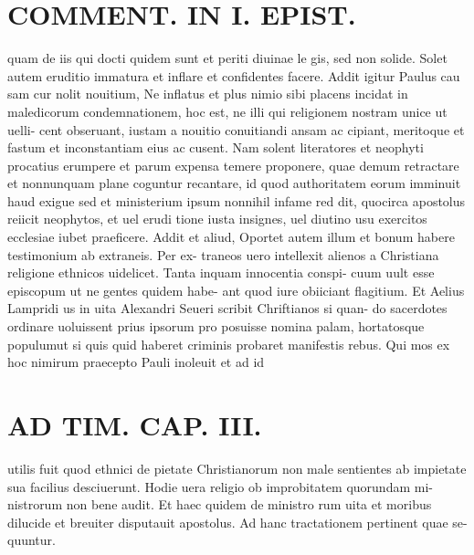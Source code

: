\documentclass{article}
\begin{document}
\begin{pages}
\section*{COMMENT. IN I. EPIST. }\pstart quam de iis qui docti quidem sunt et periti diuinae le gis, sed non solide. Solet autem eruditio immatura et inflare et confidentes facere. Addit igitur Paulus cau sam cur nolit nouitium, Ne inflatus et plus nimio sibi placens incidat in maledicorum condemnationem, hoc est, ne illi qui religionem nostram unice ut uelli- cent obseruant, iustam a nouitio conuitiandi ansam ac cipiant, meritoque et fastum et inconstantiam eius ac cusent. Nam solent literatores et neophyti procatius erumpere et parum expensa temere proponere, quae demum retractare et nonnunquam plane coguntur recantare, id quod authoritatem eorum imminuit haud exigue sed et ministerium ipsum nonnihil infame red dit, quocirca apostolus reiicit neophytos, et uel erudi tione iusta insignes, uel diutino usu exercitos ecclesiae iubet praeficere. Addit et aliud, Oportet autem illum et bonum habere testimonium ab extraneis. Per ex- traneos uero intellexit alienos a Christiana religione ethnicos uidelicet. Tanta inquam innocentia conspi- cuum uult esse episcopum ut ne gentes quidem habe- ant quod iure obiiciant flagitium. Et Aelius Lampridi us in uita Alexandri Seueri scribit Chriftianos si quan- do sacerdotes ordinare uoluissent prius ipsorum pro posuisse nomina palam, hortatosque populumut si quis quid haberet criminis probaret manifestis rebus. Qui mos ex hoc nimirum praecepto Pauli inoleuit et ad id  \pend
\section*{AD TIM. CAP. III. }
\marginpar{[ p.130 ]}\pstart utilis fuit quod ethnici de pietate Christianorum non male sentientes ab impietate sua facilius desciuerunt. Hodie uera religio ob improbitatem quorundam mi- nistrorum non bene audit. Et haec quidem de ministro rum uita et moribus dilucide et breuiter disputauit apostolus. Ad hanc tractationem pertinent quae se- quuntur.  \pend
{}
{}

\end{pages}
\end{document}
